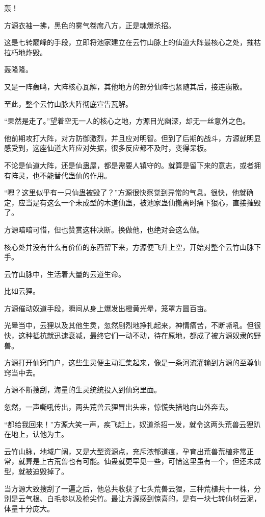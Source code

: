 
\begin{this_body}

轰！

方源衣袖一拂，黑色的雾气卷席八方，正是魂爆杀招。

这是七转巅峰的手段，立即将池家建立在云竹山脉上的仙道大阵最核心之处，摧枯拉朽地炸毁。

轰隆隆。

又是一阵轰鸣，大阵核心瓦解，其他地方的部分仙阵也紧随其后，接连崩散。

至此，整个云竹山脉大阵彻底宣告瓦解。

“果然是走了。”望着空无一人的核心之地，方源目光幽深，却无一丝意外之色。

他前期攻打大阵，对方防御激烈，并且应对明智。但到了后期的战斗，方源就明显感受到，这座仙道大阵应对失据，很多反应都不及时，变得呆板。

不论是仙道大阵，还是仙蛊屋，都是需要人镇守的。就算是留下来的意志，或者拥有阵灵，也不能替代蛊仙的作用。

“嗯？这里似乎有一只仙蛊被毁了？”方源很快察觉到异常的气息。很快，他就确定，应当是有这么一个未成型的木道仙蛊，被池家蛊仙撤离时痛下狠心，直接摧毁了。

方源暗暗可惜，但也赞赏这种决断。换做他，也绝对会这么做。

核心处并没有什么有价值的东西留下来，方源便飞升上空，开始对整个云竹山脉下手。

云竹山脉中，生活着大量的云道生命。

比如云狸。

方源催动奴道手段，瞬间从身上爆发出橙黄光晕，笼罩方圆百亩。

光晕当中，云狸以及其他生灵，忽然剧烈地挣扎起来，神情痛苦，不断嘶吼。但很快，这种抵抗就迅速衰减，最终它们一动不动，待在原地，都成了被方源奴隶的野兽。

方源打开仙窍门户，这些生灵便主动汇集起来，像是一条河流灌输到方源的至尊仙窍当中去。

方源不断搜刮，海量的生灵统统投入到仙窍里面。

忽然，一声嘶吼传出，两头荒兽云狸冒出头来，惊慌失措地向山外奔去。

“都给我回来！”方源大笑一声，疾飞赶上，奴道杀招一发，就令这两头荒兽云狸趴在地上，认他为主。

云竹山脉，地域广阔，又是大型资源点，充斥浓郁道痕，孕育出荒兽荒植非常正常，就算是上古荒兽也有可能。仙蛊就更罕见一些，可惜这里虽有一个，但还未成型，就被迫毁掉了。

当方源大致搜刮了一遍之后，他总共收获了七头荒兽云狸，三种荒植共十一株，分别是云气根、白毛参以及枪尖竹。最让方源感到惊喜的，是有一块七转仙材云泥，体量十分庞大。


\end{this_body}

